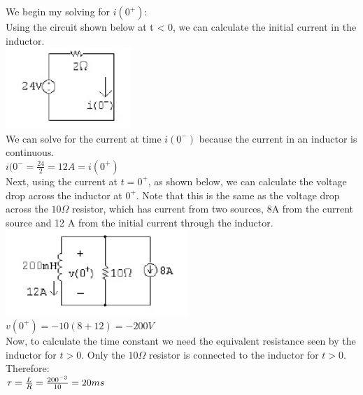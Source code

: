 We begin my solving for $i(0^{+})$:\\
Using the circuit shown below at t < 0, we can calculate the initial current 
in the inductor. \\
\includegraphics{img/c7/a1} \\	
We can solve for the current at time $i(0^{-})$ because the current in an
inductor is continuous.
\\ $i(0^{-} = \frac{24}{2} = 12 A = i(0^{+}) $ \\
Next, using the current at $t = 0^{+}$, as shown below, we can calculate the
voltage drop across the inductor at $0^{+}$. Note that this is the same as the
voltage drop across the $10\Omega$ resistor, which has current from two sources,
8A from the current source and 12 A from the initial current through the
inductor. \\
\includegraphics{img/c7/a2}\\
$ v(0^{+}) = -10(8+12) = -200 V $ \\
Now, to calculate the time constant we need the equivalent resistance seen
by the inductor for $t > 0 $. Only the $10 \Omega$ resistor is connected to
the inductor for $ t > 0$. Therefore:
\\ $ \tau = \frac{L}{R} = \frac{200 \time 10^{-3}}{10} = 20 ms $ \\

